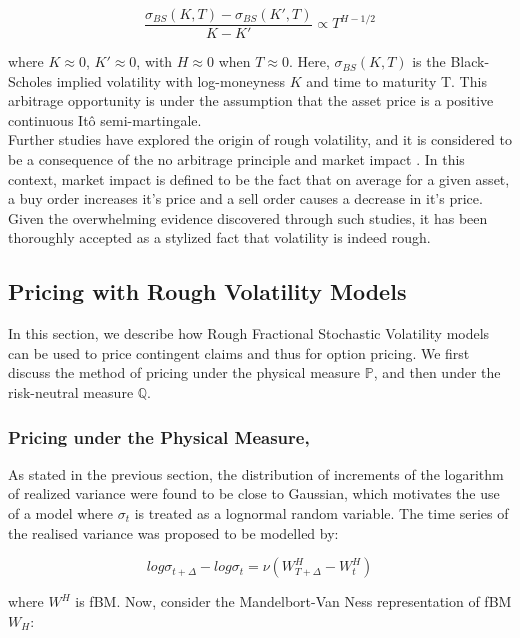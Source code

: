 \documentclass[12pt,oneside]{article}
\begin{document}
\begin{equation}
\label{eqn:powerlaw}
\frac{\sigma_{BS}(K,T) - \sigma_{BS}(K',T)}{K-K'}\propto T^{H-1/2}
\end{equation}

where $K \approx 0$, $K' \approx 0$, with $H \approx 0$ when $T \approx 0$. Here, $\sigma_{BS}(K,T)$ is the Black-Scholes implied volatility with log-moneyness $K$ and time to maturity T. This arbitrage opportunity is under the assumption that the asset price is a positive continuous It\^o semi-martingale.
\\

Further studies have explored the origin of rough volatility, and it is considered to be a consequence of the no arbitrage principle and market impact \cite{Jusselin2018}. In this context, market impact is defined to be the fact that on average for a given asset, a buy order increases it's price and a sell order causes a decrease in it's price. Given the overwhelming evidence discovered through such studies, it has been thoroughly accepted as a stylized fact that volatility is indeed rough.

\subsection{Pricing with Rough Volatility Models}
\label{sec:Pricing}
In this section, we describe how Rough Fractional Stochastic Volatility models can be used to price contingent claims and thus for option pricing. We first discuss the method of pricing under the physical measure $\mathbb{P}$, and then under the risk-neutral measure $\mathbb{Q}$. 

\subsubsection{Pricing under the Physical Measure, }

As stated in the previous section, the distribution of increments of the logarithm of realized variance were found to be close to Gaussian, which motivates the use of a model where $\sigma_{t}$ is treated as a lognormal random variable. The time series of the realised variance was proposed to be modelled by:

\begin{equation}
\label{eq:realizedvariance}
    log\sigma_{t+\Delta} - log\sigma_{t} = \nu (W_{T+\Delta}^{H} - W_{t}^{H})
\end{equation}

where $W^{H}$ is fBM.
Now, consider the Mandelbort-Van Ness representation of fBM $W_{H}$:
\end{document}
